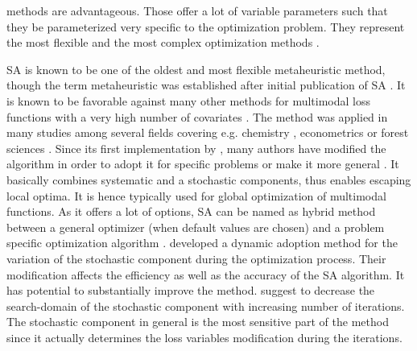 methods are advantageous. Those offer a lot of variable parameters such that they be parameterized very specific to the optimization problem. They represent the most flexible and the most complex optimization methods \citep{blum_2003}.

SA \citep{kirkpatrick_1983} is known to be one of the oldest and most flexible metaheuristic method, though the term metaheuristic was established after initial publication of SA \citep{blum_2003}. It is known to be favorable against many other methods for multimodal loss functions with a very high number of covariates \citep{corana_1987}. The method was applied in many studies among several fields covering e.g. chemistry \citep{agostini_2006}, econometrics \citep{ingber_1993} or forest sciences \citep{baskent_2002, boston_1999}. Since its first implementation by \citet{kirkpatrick_1983}, many authors have modified the algorithm in order to adopt it for specific problems \citep[e.g.][]{desarbo_1989, goffe_1996} or make it more general \citep[e.g.][]{xiang_2013}. It basically combines systematic and a stochastic components, thus enables escaping local optima. It is hence typically used for global optimization of multimodal functions. As it offers a lot of options, SA can be named as hybrid method between a general optimizer (when default values are chosen) and a problem specific optimization algorithm \citep{wegener_2005}. \citet{corana_1987} developed a dynamic adoption method for the variation of the stochastic component during the optimization process. Their modification affects the efficiency as well as the accuracy of the SA algorithm. It has potential to substantially improve the method. \citet{pronzato_1984} suggest to decrease the search-domain of the stochastic component with increasing number of iterations. The stochastic component in general is the most sensitive part of the method since it actually determines the loss variables modification during the iterations.


